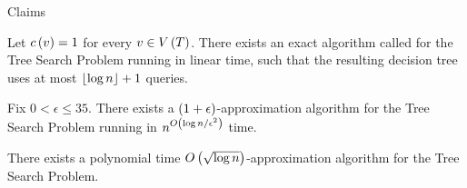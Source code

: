 \begin{frame}{Claims}
    \begin{theorem}
        Let $c\left( v \right)=1$ for every $v\in V\left( T \right)$. There exists an exact algorithm called \FRankingBasedDT for the Tree Search Problem running in linear time, such that the resulting decision tree uses at most $\left\lfloor \log n \right\rfloor +1$ queries.
    \end{theorem}
    \pause
    \begin{theorem}
        Fix $0<\epsilon\leq 35$. There exists a $\left( 1+\epsilon \right)$-approximation algorithm for the Tree Search Problem running in $n^{O\left( \log n/\epsilon^2 \right)}$ time.
    \end{theorem}
    \pause 
    \begin{theorem}
        There exists a polynomial time $O\left( \sqrt{\log n} \right)$-approximation algorithm for the Tree Search Problem.
    \end{theorem}
\end{frame}

